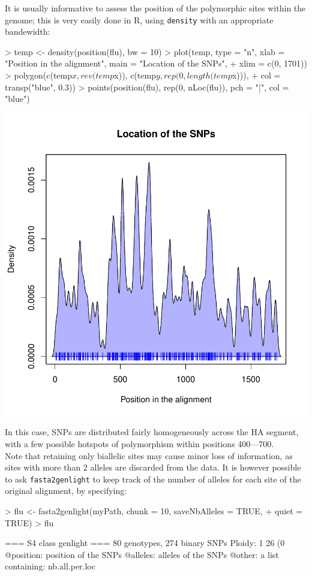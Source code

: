 \documentclass{article}
\begin{document}
\noindent It is usually informative to assess the position of the polymorphic sites within the
genome; this is very easily done in R, using \texttt{density} with an appropriate bandewidth:
\begin{Schunk}
\begin{Sinput}
> temp <- density(position(flu), bw = 10)
> plot(temp, type = "n", xlab = "Position in the alignment", main = "Location of the SNPs", 
+     xlim = c(0, 1701))
> polygon(c(temp$x, rev(temp$x)), c(temp$y, rep(0, length(temp$x))), 
+     col = transp("blue", 0.3))
> points(position(flu), rep(0, nLoc(flu)), pch = "|", col = "blue")
\end{Sinput}
\end{Schunk}
\includegraphics{figs/genomics-027}

\noindent In this case, SNPs are distributed fairly homogeneously across the HA segment, with
a few possible hotspots of polymorphism within positions 400---700.
\\


Note that retaining only biallelic sites may cause minor loss of information, as sites
with more than 2 alleles are discarded from the data.
It is however possible to ask \texttt{fasta2genlight} to keep track of the number of alleles for
each site of the original alignment, by specifying:
\begin{Schunk}
\begin{Sinput}
> flu <- fasta2genlight(myPath, chunk = 10, saveNbAlleles = TRUE, 
+     quiet = TRUE)
> flu
\end{Sinput}
\begin{Soutput}
 === S4 class genlight ===
 80 genotypes,  274 binary SNPs
 Ploidy: 1
 26 (0 %
 @position: position of the SNPs
 @alleles: alleles of the SNPs
 @other: a list containing: nb.all.per.loc 
\end{Soutput}
\end{Schunk}
\end{document}

